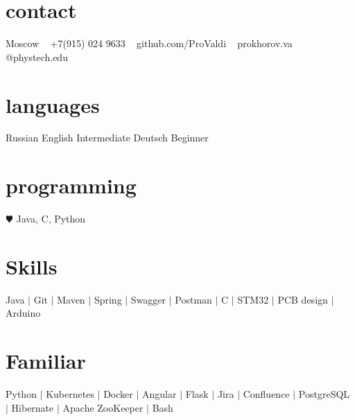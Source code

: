 \documentclass[]{cv-style}          %
\begin{document}
\lastupdated


\begin{aside}
%
\section{contact}
Moscow
~
+7(915) 024 9633
~
github.com/ProValdi
~
prokhorov.va
@phystech.edu
%
\section{languages}
Russian
English Intermediate
Deutsch Beginner
%
\section{programming}
{\color{red} $\varheartsuit$} Java, C,
Python
%
\end{aside}


\section{Skills}
  \vspace{-0.4cm}
Java {\color{red} $|$} Git {\color{red} $|$} Maven {\color{red} $|$} Spring {\color{red} $|$} Swagger {\color{red} $|$} Postman {\color{red} $|$} C {\color{red} $|$} STM32 {\color{red} $|$} PCB design {\color{red} $|$} Arduino


\section{Familiar}
  \vspace{-0.4cm}
Python {\color{red} $|$} Kubernetes {\color{red} $|$} Docker {\color{red} $|$} Angular {\color{red} $|$} Flask {\color{red} $|$} Jira {\color{red} $|$} Confluence {\color{red} $|$} PostgreSQL {\color{red} $|$} Hibernate {\color{red} $|$} Apache ZooKeeper {\color{red} $|$} Bash

\end{document}
